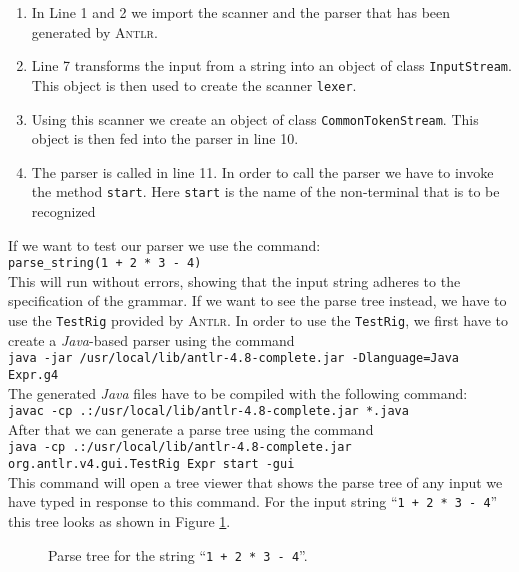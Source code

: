 \begin{enumerate}
\item In Line 1 and 2 we import the scanner and the parser that has been generated by \textsc{Antlr}.
\item Line 7 transforms the input from a string into an object of class \texttt{InputStream}.
      This object is then used to create the scanner \texttt{lexer}.
\item Using this scanner we create an object of class \texttt{CommonTokenStream}.
      This object is then fed into the parser in line 10.
\item The parser is called in line 11.  In order to call the parser we have to invoke the method 
      \texttt{start}.  Here \texttt{start} is the name of the non-terminal that is to be recognized
\end{enumerate}
If we want to test our parser we use the command:
\\[0.2cm]
\hspace*{1.3cm}
\texttt{parse\_string(1 + 2 * 3 - 4)}
\\[0.2cm]
This will run without errors, showing that the input string adheres to the specification of the grammar.
If we want to see the parse tree instead, we have to use the \texttt{TestRig} provided by \textsc{Antlr}.
In order to use the \texttt{TestRig}, we first have to create a \textsl{Java}-based parser using the command
\\[0.2cm]
\hspace*{1.3cm}
\texttt{java -jar /usr/local/lib/antlr-4.8-complete.jar -Dlanguage=Java Expr.g4}
\\[0.2cm]
The generated \textsl{Java} files have to be compiled with the following command:
\\[0.2cm]
\hspace*{1.3cm}
\texttt{javac -cp .:/usr/local/lib/antlr-4.8-complete.jar *.java}
\\[0.2cm]
After that we can generate a parse tree using the command
\\[0.2cm]
\hspace*{0.3cm}
\texttt{java -cp .:/usr/local/lib/antlr-4.8-complete.jar org.antlr.v4.gui.TestRig Expr start -gui}
\\[0.2cm]
This command will open a tree viewer that shows the parse tree of any input we have typed in response to this command.
For the input string ``\texttt{1 + 2 * 3 - 4}''  this tree looks as shown in Figure \ref{fig:parse-tree.pdf}.

\begin{figure}[!ht]
  \centering
   \caption{Parse tree for the string ``\texttt{1 + 2 * 3 - 4}''.}
  \label{fig:parse-tree.pdf}
\end{figure}



